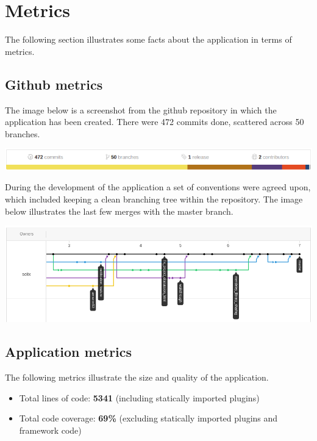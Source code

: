 \section{Metrics}

The following section illustrates some facts about the application in terms of metrics. 

\subsection{Github metrics}

The image below is a screenshot from the github repository in which the application has been created.
There were 472 commits done, scattered across 50 branches.

\begin{center}
\includegraphics[scale=0.5]{./img/github_stats.png}
\end{center}

During the development of the application a set of conventions were agreed upon, which included keeping a clean
branching tree within the repository. The image below illustrates the last few merges with the master branch.

\begin{center}
\includegraphics[scale=0.5]{./img/github_tree.png}
\end{center}

\subsection{Application metrics}

The following metrics illustrate the size and quality of the application.

\begin{itemize}
	\item Total lines of code: \textbf{5341} (including statically imported plugins)
	\item Total code coverage: \textbf{69\%} (excluding statically imported plugins and framework code)
\end{itemize}